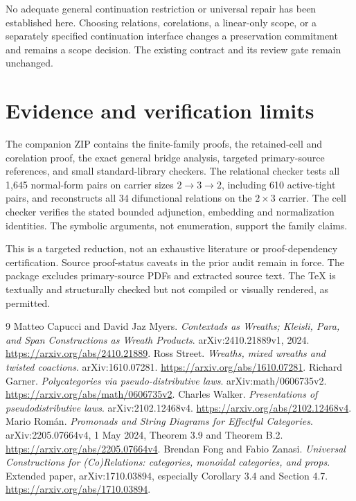 \documentclass[11pt,a4paper]{article}
\begin{document}
No adequate general continuation restriction or universal repair has been
established here. Choosing relations, corelations, a linear-only scope, or a
separately specified continuation interface changes a preservation commitment
and remains a scope decision. The existing contract and its review gate remain
unchanged.

\section{Evidence and verification limits}

The companion ZIP contains the finite-family proofs, the retained-cell and
corelation proof, the exact general bridge analysis, targeted primary-source
references, and small standard-library checkers. The relational checker tests
all 1,645 normal-form pairs on carrier sizes \(2\to3\to2\), including 610
active-tight pairs, and reconstructs all 34 difunctional relations on the
\(2\times3\) carrier. The cell checker verifies the stated bounded adjunction,
embedding and normalization identities. The symbolic arguments, not enumeration,
support the family claims.

This is a targeted reduction, not an exhaustive literature or proof-dependency
certification. Source proof-status caveats in the prior audit remain in force.
The package excludes primary-source PDFs and extracted source text. The TeX is
textually and structurally checked but not compiled or visually rendered, as
permitted.

\begin{thebibliography}{9}
 Matteo Capucci and David Jaz Myers.
\emph{Contextads as Wreaths; Kleisli, Para, and Span Constructions as Wreath Products}.
arXiv:2410.21889v1, 2024.
\url{https://arxiv.org/abs/2410.21889}.
 Ross Street.
\emph{Wreaths, mixed wreaths and twisted coactions}.
arXiv:1610.07281.
\url{https://arxiv.org/abs/1610.07281}.
 Richard Garner.
\emph{Polycategories via pseudo-distributive laws}.
arXiv:math/0606735v2.
\url{https://arxiv.org/abs/math/0606735v2}.
 Charles Walker.
\emph{Presentations of pseudodistributive laws}.
arXiv:2102.12468v4.
\url{https://arxiv.org/abs/2102.12468v4}.
 Mario Rom\'an.
\emph{Promonads and String Diagrams for Effectful Categories}.
arXiv:2205.07664v4, 1 May 2024, Theorem 3.9 and Theorem B.2.
\url{https://arxiv.org/abs/2205.07664v4}.
 Brendan Fong and Fabio Zanasi.
\emph{Universal Constructions for (Co)Relations: categories, monoidal categories, and props}.
Extended paper, arXiv:1710.03894, especially Corollary 3.4 and Section 4.7.
\url{https://arxiv.org/abs/1710.03894}.
\end{thebibliography}
\end{document}
